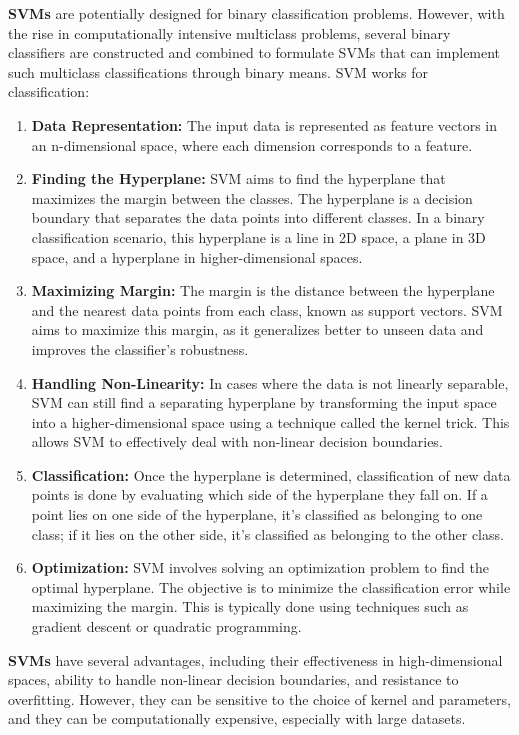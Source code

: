 \documentclass[a4paper]{article}
\theoremstyle{definition}
\begin{document}
\textbf{SVMs} are potentially designed for binary classification problems. However, with the rise in computationally intensive multiclass problems, several binary classifiers are constructed and combined to formulate SVMs that can implement such multiclass classifications through binary means. SVM works for classification:
\begin{enumerate}
\item \textbf{Data Representation:} The input data is represented as feature vectors in an n-dimensional space, where each dimension corresponds to a feature.
\item \textbf{Finding the Hyperplane:} SVM aims to find the hyperplane that maximizes the margin between the classes. The hyperplane is a decision boundary that separates the data points into different classes. In a binary classification scenario, this hyperplane is a line in 2D space, a plane in 3D space, and a hyperplane in higher-dimensional spaces.
\item \textbf{Maximizing Margin:} The margin is the distance between the hyperplane and the nearest data points from each class, known as support vectors. SVM aims to maximize this margin, as it generalizes better to unseen data and improves the classifier's robustness.
\item \textbf{Handling Non-Linearity:} In cases where the data is not linearly separable, SVM can still find a separating hyperplane by transforming the input space into a higher-dimensional space using a technique called the kernel trick. This allows SVM to effectively deal with non-linear decision boundaries.
\item \textbf{Classification:} Once the hyperplane is determined, classification of new data points is done by evaluating which side of the hyperplane they fall on. If a point lies on one side of the hyperplane, it's classified as belonging to one class; if it lies on the other side, it's classified as belonging to the other class.
\item \textbf{Optimization:} SVM involves solving an optimization problem to find the optimal hyperplane. The objective is to minimize the classification error while maximizing the margin. This is typically done using techniques such as gradient descent or quadratic programming.
\end{enumerate}

\textbf{SVMs} have several advantages, including their effectiveness in high-dimensional spaces, ability to handle non-linear decision boundaries, and resistance to overfitting. However, they can be sensitive to the choice of kernel and parameters, and they can be computationally expensive, especially with large datasets.
\end{document}
